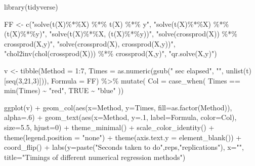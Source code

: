 \documentclass[
  letterpaper,
]{book}
\newenvironment{Shaded}{\begin{snugshade}}{\end{snugshade}}
\newcommand{\AttributeTok}[1]{\textcolor[rgb]{0.40,0.45,0.13}{#1}}
\newcommand{\ConstantTok}[1]{\textcolor[rgb]{0.56,0.35,0.01}{#1}}
\newcommand{\DecValTok}[1]{\textcolor[rgb]{0.68,0.00,0.00}{#1}}
\newcommand{\FloatTok}[1]{\textcolor[rgb]{0.68,0.00,0.00}{#1}}
\newcommand{\FunctionTok}[1]{\textcolor[rgb]{0.28,0.35,0.67}{#1}}
\newcommand{\NormalTok}[1]{\textcolor[rgb]{0.00,0.23,0.31}{#1}}
\newcommand{\OtherTok}[1]{\textcolor[rgb]{0.00,0.23,0.31}{#1}}
\newcommand{\SpecialCharTok}[1]{\textcolor[rgb]{0.37,0.37,0.37}{#1}}
\newcommand{\StringTok}[1]{\textcolor[rgb]{0.13,0.47,0.30}{#1}}
\begin{document}
\begin{Shaded}
\begin{Highlighting}[]
\FunctionTok{library}\NormalTok{(tidyverse)}

\NormalTok{FF }\OtherTok{\textless{}{-}} \FunctionTok{c}\NormalTok{(}\StringTok{"solve(t(X)\%*\%X) \%*\% t(X) \%*\% y"}\NormalTok{,}
        \StringTok{"solve(t(X)\%*\%X) \%*\% (t(X)\%*\%y)"}\NormalTok{,}
        \StringTok{"solve(t(X)\%*\%X, (t(X)\%*\%y))"}\NormalTok{,}
        \StringTok{"solve(crossprod(X)) \%*\% crossprod(X,y)"}\NormalTok{,}
        \StringTok{"solve(crossprod(X), crossprod(X,y))"}\NormalTok{,}
        \StringTok{"chol2inv(chol(crossprod(X))) \%*\% crossprod(X,y)"}\NormalTok{,}
        \StringTok{"qr.solve(X,y)"}\NormalTok{)}

\NormalTok{v }\OtherTok{\textless{}{-}} \FunctionTok{tibble}\NormalTok{(}\AttributeTok{Method =} \DecValTok{1}\SpecialCharTok{:}\DecValTok{7}\NormalTok{, }
            \AttributeTok{Times =} \FunctionTok{as.numeric}\NormalTok{(}\FunctionTok{gsub}\NormalTok{(}\StringTok{" sec elapsed"}\NormalTok{, }\StringTok{""}\NormalTok{, }\FunctionTok{unlist}\NormalTok{(t)[}\FunctionTok{seq}\NormalTok{(}\DecValTok{3}\NormalTok{,}\DecValTok{21}\NormalTok{,}\DecValTok{3}\NormalTok{)])), }
            \AttributeTok{Formula =}\NormalTok{ FF) }\SpecialCharTok{\%\textgreater{}\%} 
  \FunctionTok{mutate}\NormalTok{(}
    \AttributeTok{Col =} \FunctionTok{case\_when}\NormalTok{(}
\NormalTok{      Times }\SpecialCharTok{==} \FunctionTok{min}\NormalTok{(Times) }\SpecialCharTok{\textasciitilde{}} \StringTok{"red"}\NormalTok{,}
      \ConstantTok{TRUE} \SpecialCharTok{\textasciitilde{}} \StringTok{"blue"}
\NormalTok{  ))}

\FunctionTok{ggplot}\NormalTok{(v) }\SpecialCharTok{+} 
  \FunctionTok{geom\_col}\NormalTok{(}\FunctionTok{aes}\NormalTok{(}\AttributeTok{x=}\NormalTok{Method, }\AttributeTok{y=}\NormalTok{Times, }\AttributeTok{fill=}\FunctionTok{as.factor}\NormalTok{(Method)), }\AttributeTok{alpha=}\NormalTok{.}\DecValTok{6}\NormalTok{) }\SpecialCharTok{+} 
  \FunctionTok{geom\_text}\NormalTok{(}\FunctionTok{aes}\NormalTok{(}\AttributeTok{x=}\NormalTok{Method, }\AttributeTok{y=}\NormalTok{.}\DecValTok{1}\NormalTok{, }\AttributeTok{label=}\NormalTok{Formula, }\AttributeTok{color=}\NormalTok{Col), }\AttributeTok{size=}\FloatTok{5.5}\NormalTok{, }\AttributeTok{hjust=}\DecValTok{0}\NormalTok{) }\SpecialCharTok{+}
  \FunctionTok{theme\_minimal}\NormalTok{() }\SpecialCharTok{+} 
  \FunctionTok{scale\_color\_identity}\NormalTok{() }\SpecialCharTok{+} 
  \FunctionTok{theme}\NormalTok{(}\AttributeTok{legend.position =} \StringTok{"none"}\NormalTok{) }\SpecialCharTok{+} 
  \FunctionTok{theme}\NormalTok{(}\AttributeTok{axis.text.y =} \FunctionTok{element\_blank}\NormalTok{()) }\SpecialCharTok{+} 
  \FunctionTok{coord\_flip}\NormalTok{() }\SpecialCharTok{+} 
  \FunctionTok{labs}\NormalTok{(}\AttributeTok{y=}\FunctionTok{paste}\NormalTok{(}\StringTok{"Seconds taken to do"}\NormalTok{,reps,}\StringTok{"replications"}\NormalTok{), }\AttributeTok{x=}\StringTok{""}\NormalTok{, }
       \AttributeTok{title=}\StringTok{"Timings of different numerical regression methods"}\NormalTok{)}
\end{Highlighting}
\end{Shaded}
\end{document}
